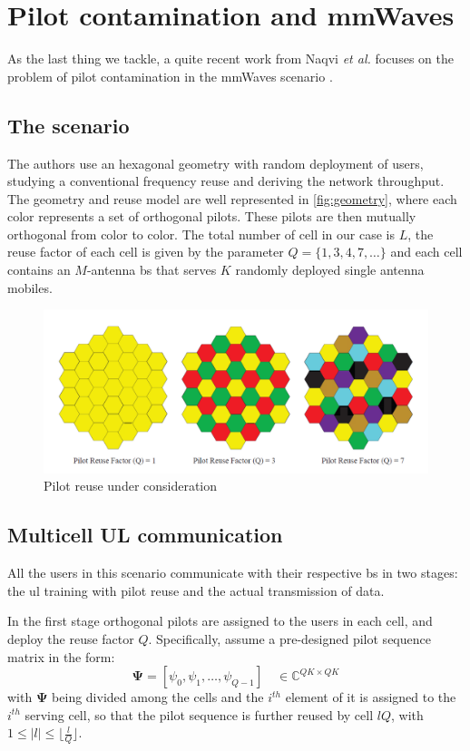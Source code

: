 \documentclass[11pt]{book}
\begin{document}
\section{Pilot contamination and mmWaves}
As the last thing we tackle, a quite recent work from Naqvi \textit{et al.} focuses on the problem of pilot contamination in the mmWaves scenario \cite{Ahsan2016}.
\subsection{The scenario}
The authors use an hexagonal geometry with random deployment of users, studying a conventional frequency reuse and deriving the network throughput. The geometry and reuse model are well represented in \autoref{fig:geometry}, where each color represents a set of orthogonal pilots. These pilots are then mutually orthogonal from color to color. The total number of cell in our case is $L$, the reuse factor of each cell is given by the parameter $Q = \{1,3,4,7,\dots\}$ and each cell contains an $M$-antenna \gls{bs} that serves $K$ randomly deployed single antenna mobiles.
\begin{figure}
\centering
  \includegraphics[width = .7\textwidth]{geometry.png}
  \caption{Pilot reuse under consideration}
  \label{fig:geometry}
\end{figure}
\subsection{Multicell UL communication}
All the users in this scenario communicate with their respective \gls{bs} in two stages: the \gls{ul} training with pilot reuse and the actual transmission of data.

In the first stage orthogonal pilots are assigned to the users in each cell, and deploy the reuse factor $Q$. Specifically, assume a pre-designed pilot sequence matrix in the form:
\begin{equation}
  \mathbf{\Psi} = [\psi_0,\psi_1,\dots,\psi_{Q-1}] \quad \in \mathbb{C}^{QK\times QK}
\end{equation}
with $\mathbf{\Psi}$ being divided among the cells and the $i^{th}$ element of it is assigned to the $i^{th}$ serving cell, so that the pilot sequence is further reused by cell $lQ$, with $1 \leq |l| \leq \lfloor\frac{l}{Q}\rfloor$.
\end{document}
